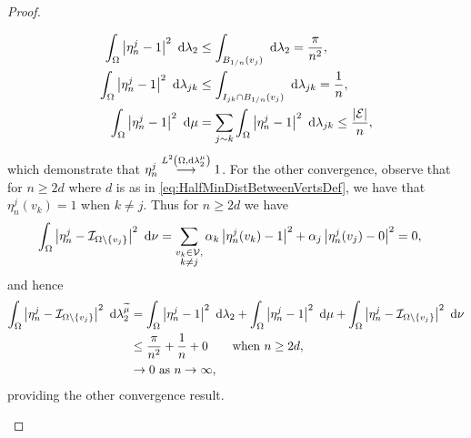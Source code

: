 \begin{proof}
\begin{enumerate}[(i)]
\begin{align*}
			\int_{\Omega}\left\lvert  \eta_n^j - 1  \right\rvert^2 \ \mathrm{d}\lambda_2
			&\leq \int_{B_{1/n}(v_j)} \ \mathrm{d}\lambda_2 = \frac{\pi}{n^2}, \\
			\int_{\Omega}\left\lvert  \eta_n^j - 1  \right\rvert^2 \ \mathrm{d}\lambda_{jk}
			&\leq \int_{I_{jk} \cap B_{1/n}(v_j)} \ \mathrm{d}\lambda_{jk} = \frac{1}{n}, \\
			\int_{\Omega}\left\lvert  \eta_n^j - 1  \right\rvert^2 \ \mathrm{d}\mu
			&= \sum_{j\sim k} \int_{\Omega}\left\lvert  \eta_n^j - 1  \right\rvert^2 \ \mathrm{d}\lambda_{jk} \leq \frac{\left\lvert \mathcal{E} \right\rvert}{n},
		\end{align*}
		which demonstrate that $\eta_n^j \overset{L^{2}\left( \Omega,\mathrm{d} \lambda_2^{\mu} \right)}{\longrightarrow} 1$.
		For the other convergence, observe that for $n \geq 2d$ where $d$ is as in \eqref{eq:HalfMinDistBetweenVertsDef}, we have that $\eta_n^j(v_k) = 1$ when $k\neq j$.
		Thus for $n \geq 2d$ we have
		\begin{align*}
			\int_{\Omega}\left\lvert  \eta_n^j - \mathcal{I}_{\Omega\setminus\left\{ v_j \right\}}  \right\rvert^2 \ \mathrm{d}\nu
			&= \sum_{\substack{v_k\in\mathcal{V}, \\ k\neq j}}\alpha_k\left\lvert \eta_n^j(v_k) - 1 \right\rvert^2
			+ \alpha_j\left\lvert  \eta_n^j(v_j) - 0  \right\rvert^2
			= 0,
		\end{align*}
		and hence
		\begin{align*}
			\int_{\Omega}\left\lvert  \eta_n^j - \mathcal{I}_{\Omega\setminus\left\{ v_j \right\}}  \right\rvert^2 \ \mathrm{d}\lambda_2^{\widetilde{\mu}}
			&= \int_{\Omega}\left\lvert  \eta_n^j - 1  \right\rvert^2 \ \mathrm{d}\lambda_2
			+ \int_{\Omega}\left\lvert  \eta_n^j - 1  \right\rvert^2 \ \mathrm{d}\mu
			+ \int_{\Omega}\left\lvert  \eta_n^j - \mathcal{I}_{\Omega\setminus\left\{ v_j \right\}}  \right\rvert^2 \ \mathrm{d}\nu \\
			&\leq \frac{\pi}{n^2} + \frac{1}{n} + 0 \qquad\text{when } n\geq 2d, \\
			&\rightarrow 0 \ \text{as} \ n \rightarrow\infty,
		\end{align*}
		providing the other convergence result.
	\end{enumerate}
\end{proof}


